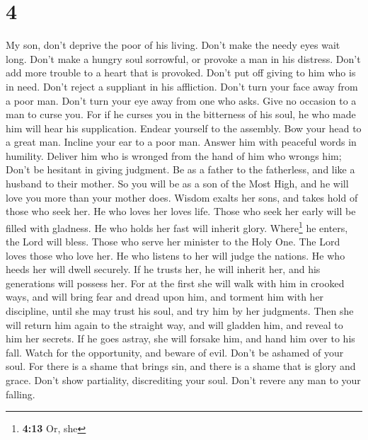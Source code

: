 \hypertarget{section-2}{%
\section{4}\label{section-2}}

 My son, don't deprive the poor of his living. Don't make
the needy eyes wait long.  Don't make a hungry soul
sorrowful, or provoke a man in his distress.  Don't add
more trouble to a heart that is provoked. Don't put off giving to him
who is in need.  Don't reject a suppliant in his
affliction. Don't turn your face away from a poor man. 
Don't turn your eye away from one who asks. Give no occasion to a man to
curse you.  For if he curses you in the bitterness of his
soul, he who made him will hear his supplication.  Endear
yourself to the assembly. Bow your head to a great man. 
Incline your ear to a poor man. Answer him with peaceful words in
humility.  Deliver him who is wronged from the hand of him
who wrongs him; Don't be hesitant in giving judgment.  Be
as a father to the fatherless, and like a husband to their mother. So
you will be as a son of the Most High, and he will love you more than
your mother does.  Wisdom exalts her sons, and takes hold
of those who seek her.  He who loves her loves life.
Those who seek her early will be filled with gladness. 
He who holds her fast will inherit glory. Where\footnote{\textbf{4:13}
  Or, she} he enters, the Lord will bless.  Those who
serve her minister to the Holy One. The Lord loves those who love her.
 He who listens to her will judge the nations. He who
heeds her will dwell securely.  If he trusts her, he will
inherit her, and his generations will possess her.  For
at the first she will walk with him in crooked ways, and will bring fear
and dread upon him, and torment him with her discipline, until she may
trust his soul, and try him by her judgments.  Then she
will return him again to the straight way, and will gladden him, and
reveal to him her secrets.  If he goes astray, she will
forsake him, and hand him over to his fall.  Watch for
the opportunity, and beware of evil. Don't be ashamed of your soul.
 For there is a shame that brings sin, and there is a
shame that is glory and grace.  Don't show partiality,
discrediting your soul. Don't revere any man to your falling.
